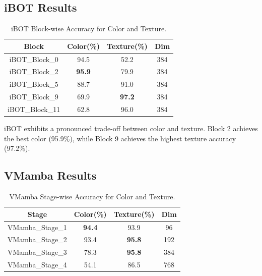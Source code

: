 \documentclass[conference]{IEEEtran}
\begin{document}
\subsection{iBOT Results}

\begin{table}[htbp]
\caption{iBOT Block-wise Accuracy for Color and Texture.}
\begin{center}
\begin{tabular}{|c|c|c|c|}
\hline
\textbf{Block} & \textbf{Color(\%)} & \textbf{Texture(\%)} & \textbf{Dim}\\
\hline
iBOT\_Block\_0 & 94.5 & 52.2 & 384 \\
\hline
iBOT\_Block\_2 & \textbf{95.9} & 79.9 & 384 \\
\hline
iBOT\_Block\_5 & 88.7 & 91.0 & 384 \\
\hline
iBOT\_Block\_9 & 69.9 & \textbf{97.2} & 384 \\
\hline
iBOT\_Block\_11 & 62.8 & 96.0 & 384 \\
\hline
\end{tabular}
\label{tab3}
\end{center}
\end{table}

iBOT exhibits a pronounced trade-off between color and texture. Block 2 achieves the best color (95.9\%), while Block 9 achieves the highest texture accuracy (97.2\%).

\subsection{VMamba Results}

\begin{table}[htbp]
\caption{VMamba Stage-wise Accuracy for Color and Texture.}
\begin{center}
\begin{tabular}{|c|c|c|c|}
\hline
\textbf{Stage} & \textbf{Color(\%)} & \textbf{Texture(\%)} & \textbf{Dim}\\
\hline
VMamba\_Stage\_1 & \textbf{94.4} & 93.9 & 96 \\
\hline
VMamba\_Stage\_2 & 93.4 & \textbf{95.8} & 192 \\
\hline
VMamba\_Stage\_3 & 78.3 & \textbf{95.8} & 384 \\
\hline
VMamba\_Stage\_4 & 54.1 & 86.5 & 768 \\
\hline
\end{tabular}
\label{tab4}
\end{center}
\end{table}
\end{document}
